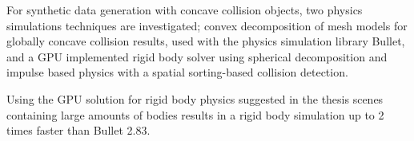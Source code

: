 For synthetic data generation with concave collision objects, two physics simulations techniques are investigated;
convex decomposition of
mesh models for globally concave collision results, used with the physics simulation
library Bullet, and a GPU implemented rigid body solver using spherical decomposition
and impulse based physics with a spatial sorting-based collision detection.

Using the GPU solution for rigid body physics suggested in the thesis scenes
 containing large amounts of bodies results in a rigid body simulation up to 2 times
 faster than Bullet 2.83.
